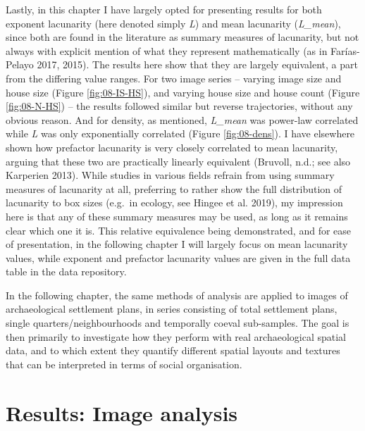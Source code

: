 \documentclass[
  12pt,
  a4paper, twoside]{book}
\begin{document}
Lastly, in this chapter I have largely opted for presenting results for both exponent lacunarity (here denoted simply \emph{L}) and mean lacunarity (\emph{L\_mean}), since both are found in the literature as summary measures of lacunarity, but not always with explicit mention of what they represent mathematically (as in Farías-Pelayo 2017, 2015). The results here show that they are largely equivalent, a part from the differing value ranges. For two image series -- varying image size and house size (Figure \ref{fig:08-IS-HS}), and varying house size and house count (Figure \ref{fig:08-N-HS}) -- the results followed similar but reverse trajectories, without any obvious reason. And for density, as mentioned, \emph{L\_mean} was power-law correlated while \emph{L} was only exponentially correlated (Figure \ref{fig:08-dens}). I have elsewhere shown how prefactor lacunarity is very closely correlated to mean lacunarity, arguing that these two are practically linearly equivalent (Bruvoll, n.d.; see also Karperien 2013). While studies in various fields refrain from using summary measures of lacunarity at all, preferring to rather show the full distribution of lacunarity to box sizes (e.g.~in ecology, see Hingee et al. 2019), my impression here is that any of these summary measures may be used, as long as it remains clear which one it is. This relative equivalence being demonstrated, and for ease of presentation, in the following chapter I will largely focus on mean lacunarity values, while exponent and prefactor lacunarity values are given in the full data table in the data repository.

In the following chapter, the same methods of analysis are applied to images of archaeological settlement plans, in series consisting of total settlement plans, single quarters/neighbourhoods and temporally coeval sub-samples. The goal is then primarily to investigate how they perform with real archaeological spatial data, and to which extent they quantify different spatial layouts and textures that can be interpreted in terms of social organisation.

\hypertarget{images-results}{%
\chapter{Results: Image analysis}\label{images-results}}
\end{document}
